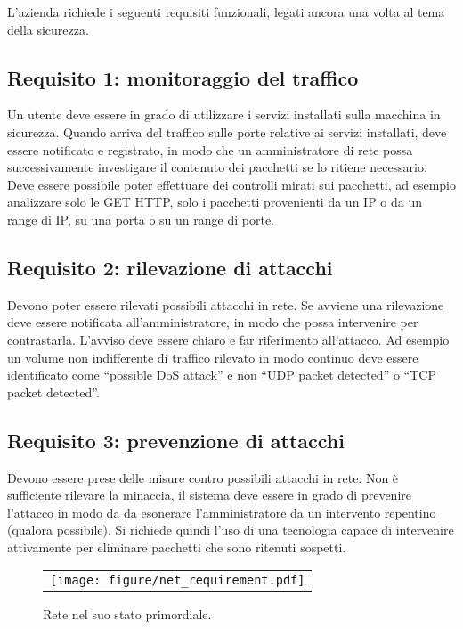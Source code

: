 L'azienda richiede i seguenti requisiti funzionali, legati ancora una volta al tema della sicurezza.

\subsection{Requisito 1: monitoraggio del traffico}

Un utente deve essere in grado di utilizzare i servizi installati sulla macchina in sicurezza. Quando arriva del traffico sulle porte relative ai servizi installati, deve essere notificato e registrato, in modo che un amministratore di rete possa successivamente investigare il contenuto dei pacchetti se lo ritiene necessario. Deve essere possibile poter effettuare dei controlli mirati sui pacchetti, ad esempio analizzare solo le GET HTTP, solo i pacchetti provenienti da un IP o da un range di IP, su una porta o su un range di porte.

\subsection{Requisito 2: rilevazione di attacchi}

Devono poter essere rilevati possibili attacchi in rete. Se avviene una rilevazione deve essere notificata all'amministratore, in modo che possa intervenire per contrastarla. L'avviso deve essere chiaro e far riferimento all'attacco. Ad esempio un volume non indifferente di traffico rilevato in modo continuo deve essere identificato come ``possible DoS attack'' e non ``UDP packet detected'' o ``TCP packet detected''.

\subsection{Requisito 3: prevenzione di attacchi}

Devono essere prese delle misure contro possibili attacchi in rete. Non è sufficiente rilevare la minaccia, il sistema deve essere in grado di prevenire l'attacco in modo da da esonerare l'amministratore da un intervento repentino (qualora possibile). Si richiede quindi l'uso di una tecnologia capace di intervenire attivamente per eliminare pacchetti che sono ritenuti sospetti.

\begin{figure}[htb]
    \begin{center}
        \begin{tabular}{l}
            \texttt{[image: figure/net\_requirement.pdf]}
        \end{tabular}
    \end{center}
    \caption{Rete nel suo stato primordiale.}
\end{figure}

